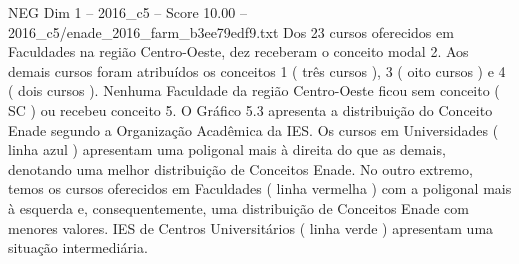 \begin{textsample}{NEG Dim 1 – 2016\_c5 – Score 10.00 – 2016\_c5/enade\_2016\_farm\_b3ee79edf9.txt}
Dos 23 cursos oferecidos em Faculdades na região Centro-Oeste, dez receberam o conceito modal 2.
Aos demais cursos foram atribuídos os conceitos 1 ( três cursos ), 3 ( oito cursos ) e 4 ( dois cursos ).
Nenhuma Faculdade da região Centro-Oeste ficou sem conceito ( SC ) ou recebeu conceito 5.
O Gráfico 5.3 apresenta a distribuição do Conceito Enade segundo a Organização Acadêmica da IES.
Os cursos em Universidades ( linha azul ) apresentam uma poligonal mais à direita do que as demais, denotando uma melhor distribuição de Conceitos Enade.
No outro extremo, temos os cursos oferecidos em Faculdades ( linha vermelha ) com a poligonal mais à esquerda e, consequentemente, uma distribuição de Conceitos Enade com menores valores.
IES de Centros Universitários ( linha verde ) apresentam uma situação intermediária.

\end{textsample}
